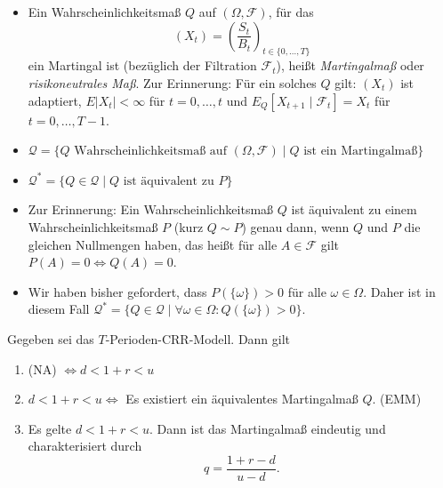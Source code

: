 \documentclass[a4paper,twoside,DIV15,BCOR12mm]{scrbook}
\newcommand{\cF}{\mathcal F}
\newcommand{\cQ}{\mathcal Q}
\begin{document}
\begin{definition}
\begin{itemize}
\item Ein Wahrscheinlichkeitsmaß $Q$ auf $(\Omega, \cF)$, für das
\[
(X_t) = \left( \frac{S_t}{B_t}\right)_{t\in\{0,\ldots,T\}}
\]
ein Martingal ist (bezüglich der Filtration $\cF_t$), heißt \emph{Martingalmaß} oder \emph{risikoneutrales Maß}. Zur Erinnerung: Für ein solches $Q$ gilt: $(X_t)$ ist adaptiert, $E|X_t|<\infty$ für $t=0,\ldots,t$ und $E_Q[X_{t+1}\mid \cF_t] = X_t$ für $t=0,\ldots,T-1$.
\item $\cQ = \{Q \text{ Wahrscheinlichkeitsmaß auf } (\Omega, \cF) \mid Q \text{ ist ein Martingalmaß} \}$
\item $\cQ^* = \{ Q \in \cQ\mid Q \text{ ist äquivalent zu }P\}$
\end{itemize}
\end{definition}

\begin{bemerkung}
\begin{itemize}
\item Zur Erinnerung: Ein Wahrscheinlichkeitsmaß $Q$ ist äquivalent zu einem Wahrscheinlichkeitsmaß $P$ (kurz $Q\sim P$) genau dann, wenn $Q$ und $P$ die gleichen Nullmengen haben, das heißt für alle $A\in\cF$ gilt $P(A)=0 \iff Q(A)=0$.
\item Wir haben bisher gefordert, dass $P(\{\omega\})>0$ für alle $\omega\in\Omega$. Daher ist in diesem Fall $\cQ^* = \{ Q\in \cQ\mid \forall \omega \in \Omega: Q(\{\omega\})>0\}$.
\end{itemize}
\end{bemerkung}

\begin{satz}
Gegeben sei das $T$\!-Perioden-CRR-Modell. Dann gilt
\begin{enumerate}
\item (NA) $\iff d < 1+r < u$
\item $d < 1+r < u \iff$ Es existiert ein äquivalentes Martingalmaß $Q$. (EMM)
\item Es gelte $d< 1+r < u$. Dann ist das Martingalmaß eindeutig und charakterisiert durch
\[
q= \frac{1+r-d}{u-d}.
\]
\end{enumerate}
\end{satz}
\end{document}
